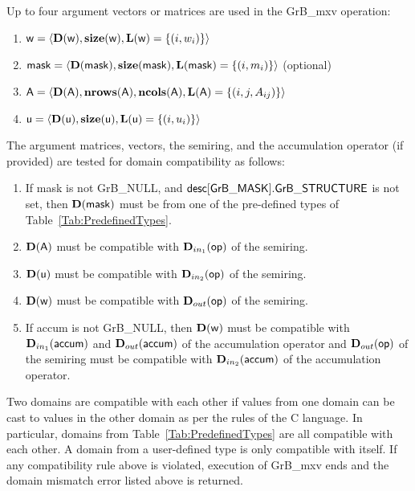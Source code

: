 Up to four argument vectors or matrices are used in the {\sf GrB\_mxv} operation:
\begin{enumerate}
	\item ${\sf w} = \langle \bold{D}({\sf w}),\bold{size}({\sf w}),\bold{L}({\sf w}) = \{(i,w_i) \} \rangle$
	\item ${\sf mask} = \langle \bold{D}({\sf mask}),\bold{size}({\sf mask}),\bold{L}({\sf mask}) = \{(i,m_i) \} \rangle$ (optional)
	\item ${\sf A} = \langle \bold{D}({\sf A}),\bold{nrows}({\sf A}), \bold{ncols}({\sf A}),\bold{L}({\sf A}) = \{(i,j,A_{ij}) \} \rangle$
	\item ${\sf u} = \langle \bold{D}({\sf u}),\bold{size}({\sf u}),\bold{L}({\sf u}) = \{(i,u_i) \} \rangle$
\end{enumerate}

The argument matrices, vectors, the semiring, and the accumulation operator (if provided) 
are tested for domain compatibility as follows:
\begin{enumerate}
	\item If {\sf mask} is not {\sf GrB\_NULL}, and ${\sf desc[GrB\_MASK].GrB\_STRUCTURE}$
    is not set, then $\bold{D}({\sf mask})$ must be from one of the pre-defined types of 
    Table~\ref{Tab:PredefinedTypes}.

	\item $\bold{D}({\sf A})$ must be compatible with $\mbox{$\mathbf{D}_{in_{1}}$}({\sf op})$ of the semiring.

	\item $\bold{D}({\sf u})$ must be compatible with $\mbox{$\mathbf{D}_{in_{2}}$}({\sf op})$ of the semiring.

	\item $\bold{D}({\sf w})$ must be compatible with $\mbox{$\mathbf{D}_{out}$}({\sf op})$ of the semiring.

	\item If {\sf accum} is not {\sf GrB\_NULL}, then $\bold{D}({\sf w})$ must be compatible with $\mbox{$\mathbf{D}_{in_{1}}$}({\sf accum})$ and $\mbox{$\mathbf{D}_{out}$}({\sf accum})$ of the 
	accumulation operator and $\mbox{$\mathbf{D}_{out}$}({\sf op})$ of the semiring must be compatible with $\mbox{$\mathbf{D}_{in_{2}}$}({\sf accum})$ of the accumulation operator.
\end{enumerate}
Two domains are compatible with each other if values from one domain can be cast 
to values in the other domain as per the rules of the C language.
In particular, domains from Table~\ref{Tab:PredefinedTypes} are all compatible 
with each other. A domain from a user-defined type is only compatible with itself.
If any compatibility rule above is violated, execution of {\sf GrB\_mxv} ends and 
the domain mismatch error listed above is returned.

